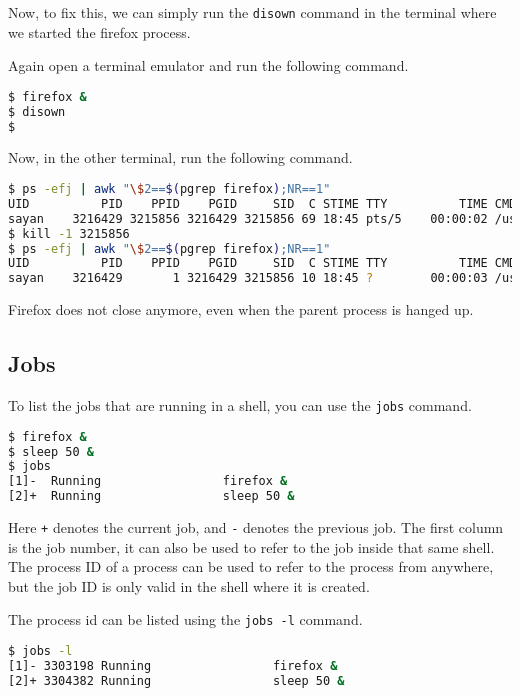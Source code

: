 Now, to fix this, we can simply run the \texttt{disown} command in the terminal
where we started the firefox process.

Again open a terminal emulator and run the following command.

\begin{lstlisting}[language=bash]
$ firefox &
$ disown
$
\end{lstlisting}

Now, in the other terminal, run the following command.

\begin{lstlisting}[language=bash]
$ ps -efj | awk "\$2==$(pgrep firefox);NR==1"
UID          PID    PPID    PGID     SID  C STIME TTY          TIME CMD
sayan    3216429 3215856 3216429 3215856 69 18:45 pts/5    00:00:02 /usr/lib/firefox/firefox
$ kill -1 3215856
$ ps -efj | awk "\$2==$(pgrep firefox);NR==1"
UID          PID    PPID    PGID     SID  C STIME TTY          TIME CMD
sayan    3216429       1 3216429 3215856 10 18:45 ?        00:00:03 /usr/lib/firefox/firefox
\end{lstlisting}

Firefox does not close anymore, even when the parent process is hanged up.

\subsection{Jobs}

To list the jobs that are running in a shell, you can use the \texttt{jobs} command.

\begin{lstlisting}[language=bash]
$ firefox &
$ sleep 50 &
$ jobs
[1]-  Running                 firefox &
[2]+  Running                 sleep 50 &
\end{lstlisting}

Here \texttt{+} denotes the current job, and \texttt{-} denotes the previous job.
The first column is the job number, it can also be used to refer to the job
inside that same shell. The process ID of a process can be used to refer to
the process from anywhere, but the job ID is only valid in the shell where
it is created.

The process id can be listed using the \texttt{jobs -l} command.

\begin{lstlisting}[language=bash]
$ jobs -l
[1]- 3303198 Running                 firefox &
[2]+ 3304382 Running                 sleep 50 &
\end{lstlisting}

